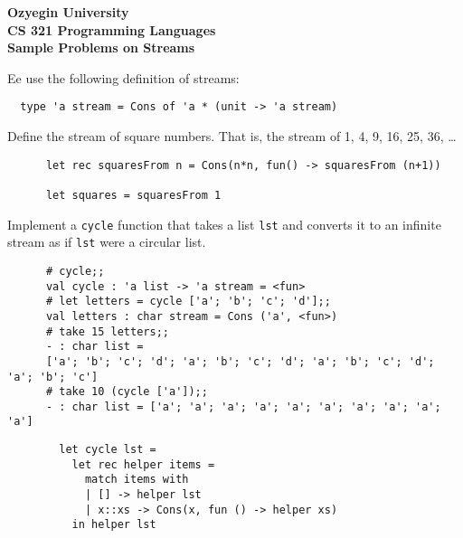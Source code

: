 \documentclass[addpoints]{exam}
\begin{document}
\begin{center}
{\Large \textbf{
    Ozyegin University\\
    CS 321 Programming Languages\\
    Sample Problems on Streams
}}
\end{center}

Ee use the following definition of streams:

\begin{verbatim}
  type 'a stream = Cons of 'a * (unit -> 'a stream)
\end{verbatim}

\begin{questions}
  \question
  Define the stream of square numbers.
  That is, the stream of 1, 4, 9, 16, 25, 36, \ldots

  \begin{solutionbox}{3cm}
    {\footnotesize
    \begin{verbatim}
      let rec squaresFrom n = Cons(n*n, fun() -> squaresFrom (n+1))

      let squares = squaresFrom 1
    \end{verbatim}
    }
  \end{solutionbox}


  \question
  Implement a \texttt{cycle} function that takes a list
  \texttt{lst} and converts it to an infinite stream as if \texttt{lst}
  were a circular list.

  {\footnotesize
    \begin{verbatim}
      # cycle;;
      val cycle : 'a list -> 'a stream = <fun>
      # let letters = cycle ['a'; 'b'; 'c'; 'd'];;
      val letters : char stream = Cons ('a', <fun>)
      # take 15 letters;;
      - : char list =
      ['a'; 'b'; 'c'; 'd'; 'a'; 'b'; 'c'; 'd'; 'a'; 'b'; 'c'; 'd'; 'a'; 'b'; 'c']
      # take 10 (cycle ['a']);;
      - : char list = ['a'; 'a'; 'a'; 'a'; 'a'; 'a'; 'a'; 'a'; 'a'; 'a']  
    \end{verbatim}
    }
  \begin{solutionbox}{3cm}
    {\footnotesize
    \begin{verbatim}
        let cycle lst =                                                       
          let rec helper items = 
            match items with
            | [] -> helper lst
            | x::xs -> Cons(x, fun () -> helper xs)
          in helper lst
    \end{verbatim}
    }
  \end{solutionbox}
  

\end{questions}
\end{document}
